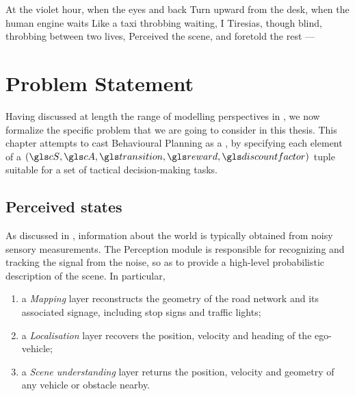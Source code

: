 
\graphicspath{{2-Chapters/3-Chapter/}}


At the violet hour, when the eyes and back
Turn upward from the desk, when the human engine waits
Like a taxi throbbing waiting,
I Tiresias, though blind, throbbing between two lives,
Perceived the scene, and foretold the rest —

\chapter{Problem Statement}
\label{chapter:3}


\abstractStartChapter{}%
Having discussed at length the range of  modelling perspectives in , we now formalize the specific problem that we are going to consider in this thesis. This chapter attempts to cast Behavioural Planning as a , by specifying each element of a $(\cS, \cA, \Ps, \R, \discount)$ tuple suitable for a set of tactical decision-making tasks.
\minitocStartChapter{}

\section{Perceived states}

As discussed in , information about the world is typically obtained from noisy sensory measurements. The Perception module is responsible for recognizing and tracking the signal from the noise, so as to provide a high-level probabilistic description of the scene. In particular, 
\begin{enumerate}[label=(\roman*)]
	\item a \emph{Mapping} layer reconstructs the geometry of the road network and its associated signage, including stop signs and traffic lights;
	\item a \emph{Localisation} layer recovers the position, velocity and heading of the ego-vehicle;
	\item a \emph{Scene understanding} layer returns the position, velocity and geometry of any vehicle or obstacle nearby.
\end{enumerate}

